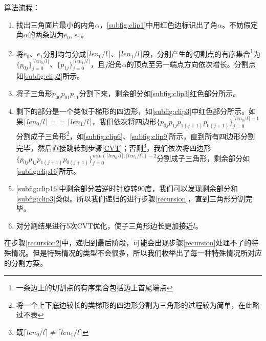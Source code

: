 算法流程：
\begin{enumerate}
    \item 找出三角面片最小的内角$\alpha$，\autoref{subfig:clip1}中用红色边标识出了角$\alpha$。不妨假定角$\alpha$的两条边为$e_0$, $e_1$。

    \item 将$e_0$、$e_1$分别均匀分成$\lceil len_0/l \rceil$、$\lceil len_1/l \rceil$段，分别产生的切割点的有序集合\footnote{一条边上的切割点的有序集合包括边上首尾端点}为$\{p_{0j}\}^{\lceil len_0/l \rceil}_{j=0}$、$\{p_{1j}\}^{\lceil len_1/l \rceil}_{j=0}$，且$j$沿角$\alpha$的顶点至另一端点方向依次增长。分割点如\autoref{subfig:clip2}所示。

    \item 将子三角形$p_{00}p_{01}p_{11}$分割下来，剩余部分如\autoref{subfig:clip3}红色部分所示。

    \item 剩下的部分是一个类似于梯形的四边形，如\autoref{subfig:clip3}中红色部分所示。如果$\lceil len_0/l \rceil == \lceil len_1/l \rceil$，我们依次将四边形$\{p_{0j}p_{1j}p_{1(j+1)}p_{0(j+1)}\}^{\lceil len_0/l \rceil - 1}_{j=0}$分割成子三角形\footnote{将一个上下底边较长的类梯形的四边形分割为三角形的过程较为简单，在此略过不表}，如\autoref{subfig:clip6}、\autoref{subfig:clip9}所示，直到所有四边形分割完毕，然后直接跳转到步骤\ref{CVT}；否则\footnote{既$\lceil len_0/l \rceil \ne \lceil len_1/l \rceil$}，我们依次将四边形$\{p_{0j}p_{1j}p_{1(j+1)}p_{0(j+1)}\}^{min(\lceil len_0/l \rceil, \lceil len_1/l \rceil) - 2}_{j=0}$分割成子三角形，剩余部分如\autoref{subfig:clip16}所示。\label{recursion}

    \item \autoref{subfig:clip16}中剩余部分若逆时针旋转90度，我们可以发现剩余部分和\autoref{subfig:clip3}类似。所以我们递归的进行步骤\ref{recursion}，直到三角形分割完毕。\label{recursion2}

    \item 对分割结果进行5次CVT优化\cite{du1999}，使子三角形边长更加接近$l$。\label{CVT}
\end{enumerate}

在步骤\ref{recursion2}中，递归到最后阶段，可能会出现步骤\ref{recursion}处理不了的特殊情况。但是特殊情况的类型不会很多，所以我们枚举出了每一种特殊情况所对应的分割方案。

